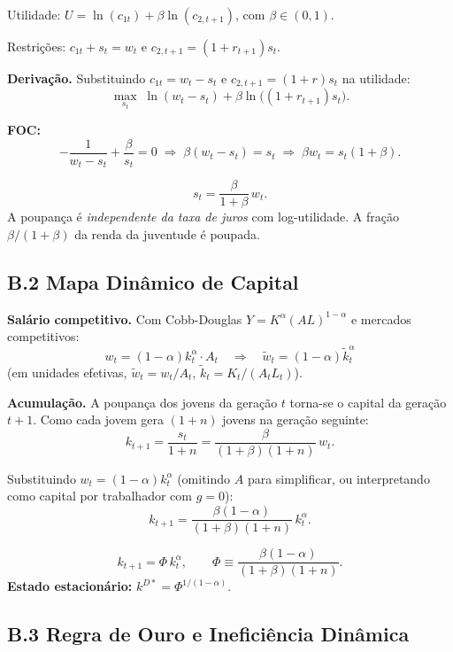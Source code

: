 \documentclass[12pt, a4paper]{article}
\begin{document}
Utilidade: $U = \ln(c_{1t}) + \beta\ln(c_{2,t+1})$, com $\beta\in(0,1)$.

Restrições: $c_{1t} + s_t = w_t$ e $c_{2,t+1} = (1+r_{t+1})s_t$.

\textbf{Derivação.} Substituindo $c_{1t} = w_t - s_t$ e $c_{2,t+1} = (1+r)s_t$ na utilidade:
\[
\max_{s_t}\; \ln(w_t - s_t) + \beta\ln\!\big((1+r_{t+1})s_t\big).
\]

\textbf{FOC:}
\[
-\frac{1}{w_t - s_t} + \frac{\beta}{s_t} = 0 \;\Longrightarrow\; \beta(w_t - s_t) = s_t \;\Longrightarrow\; \beta w_t = s_t(1+\beta).
\]

\begin{resultbox}[title={Poupança Ótima no Modelo de Diamond}]
\[
s_t = \frac{\beta}{1+\beta}\,w_t.
\]
A poupança é \emph{independente da taxa de juros} com log-utilidade. A fração $\beta/(1+\beta)$ da renda da juventude é poupada.
\end{resultbox}

\subsection*{B.2 Mapa Dinâmico de Capital}

\textbf{Salário competitivo.} Com Cobb-Douglas $Y = K^\alpha(AL)^{1-\alpha}$ e mercados competitivos:
\[
w_t = (1-\alpha)k_t^\alpha \cdot A_t \quad\Longrightarrow\quad \tilde{w}_t = (1-\alpha)\tilde{k}_t^\alpha
\]
(em unidades efetivas, $\tilde{w}_t = w_t/A_t$, $\tilde{k}_t = K_t/(A_tL_t)$).

\textbf{Acumulação.} A poupança dos jovens da geração $t$ torna-se o capital da geração $t+1$. Como cada jovem gera $(1+n)$ jovens na geração seguinte:
\[
k_{t+1} = \frac{s_t}{1+n} = \frac{\beta}{(1+\beta)(1+n)}\,w_t.
\]

Substituindo $w_t = (1-\alpha)k_t^\alpha$ (omitindo $A$ para simplificar, ou interpretando como capital por trabalhador com $g=0$):
\[
k_{t+1} = \frac{\beta(1-\alpha)}{(1+\beta)(1+n)}\,k_t^\alpha.
\]

\begin{resultbox}[title={Mapa Dinâmico de Diamond}]
\[
k_{t+1} = \Phi\, k_t^\alpha, \qquad \Phi \equiv \frac{\beta(1-\alpha)}{(1+\beta)(1+n)}.
\]
\textbf{Estado estacionário:} $k^{D*} = \Phi^{1/(1-\alpha)}$.
\end{resultbox}

\subsection*{B.3 Regra de Ouro e Ineficiência Dinâmica}
\end{document}

